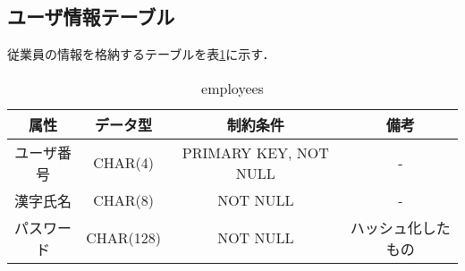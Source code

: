 \documentclass[../main]{subfiles}
\begin{document}
\subsection{ユーザ情報テーブル}
従業員の情報を格納するテーブルを表\ref{fig:data_emp}に示す．
\begin{table}[H]
\begin{center}
\begin{tabular}{|c|c|c|c|}
\hline
    属性       & データ型      &  制約条件     & 備考 \\ \hline \hline
    ユーザ番号   & CHAR(4)       & PRIMARY KEY, NOT NULL  &  - \\ \hline
    漢字氏名     & CHAR(8)       &   NOT NULL     &   - \\ \hline
    パスワード     & CHAR(128)      &  NOT NULL           &  ハッシュ化したもの \\ \hline 
    \end{tabular}
    \caption{employees}
    \label{fig:data_emp} 
\end{center}
\end{table}
\end{document}
